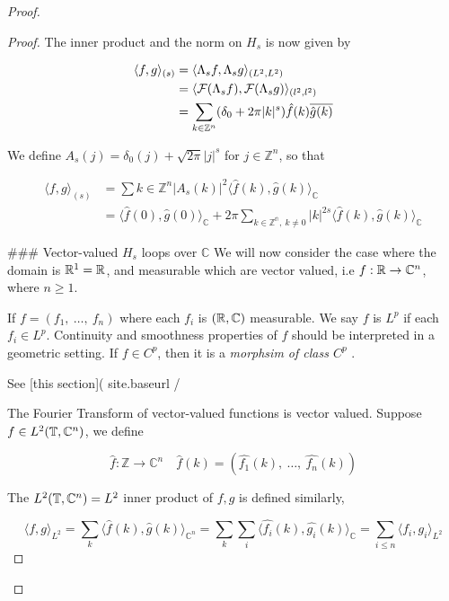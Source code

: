 \documentclass[../main-manifolds.tex]{subfiles}
\begin{document}
{{\begin{proof}
{{\begin{proof}
The inner product and the norm on $H_s$ is now given by

$$
\begin{align}
\langle f,g\rangle_{(s)} &= \langle \Lambda_s f,\Lambda_s g\rangle_{(L^2,L^2)} \\
&=\langle \mathcal{F}(\Lambda_s f),\mathcal{F}(\Lambda_s g)\rangle_{(l^2,l^2)}\\
&= \sum_{k\in\mathbb{Z}^n}(\delta_0 + 2\pi \vert k\vert^s)\hat{f}(k)\overline{\hat{g}(k)}\\
\end{align}
$$

We define $A_s(j) = \delta_0(j) + \sqrt{2\pi}\vert j\vert^s$ for $j\in\mathbb{Z}^n$, so that 

$$
\begin{align}
\langle f,g\rangle_{(s)} &= \sum{k\in\mathbb{Z}^n} \vert A_s(k)\vert^2 \langle \hat{f}(k),\hat{g}(k)\rangle_{\mathbb{C}}\\
&= \langle \hat{f}(0),\hat{g}(0)\rangle_{\mathbb{C}} + 2\pi\sum_{k\in\mathbb{Z^n},\: k\neq 0}\vert k\vert^{2s}\langle \hat{f}(k),\hat{g}(k)\rangle_{\mathbb{C}}
\end{align}
$$

### Vector-valued $H_s$ loops over $\mathbb{C}$
We will now consider the case where the domain is $\mathbb{R}^1 = \mathbb{R}$, and measurable which are vector valued, i.e $f: \mathbb{R}\to \mathbb{C}^n$, where $n\geq 1$.

If $f = (f_1,\: \ldots, \: f_n)$ where each $f_i$ is $(\mathbb{R},\mathbb{C})$ measurable. We say $f$ is $L^p$ if each $f_i\in L^p$. Continuity and smoothness properties of $f$ should be interpreted in a geometric setting. If $f\in C^p$, then it is a \emph{morphsim of class $C^p$ }.

See [this section]({{ site.baseurl }}/
{%

The Fourier Transform of vector-valued functions is vector valued. Suppose $f\in L^2(\mathbb{T}, \mathbb{C}^n)$, we define

$$
\hat{f}:\mathbb{Z}\to\mathbb{C}^n\quad \hat{f}(k) = (\hat{f_1}(k),\:\ldots,\:\hat{f_n}(k))
$$

The $L^2(\mathbb{T},\mathbb{C}^n)=L^2$ inner product of $f,g$ is defined similarly,

$$
\langle f,g\rangle_{L^2} = \sum_k \langle \hat{f}(k),\hat{g}(k)\rangle_{\mathbb{C}^n} =\sum_k\sum_i\langle\hat{f_i}(k),\hat{g_i} (k)\rangle_{\mathbb{C}} =\sum_{i\leq n}\langle f_i,g_i\rangle_{L^2}
$$

}
\end{proof}}}
\end{proof}}}
\end{document}
